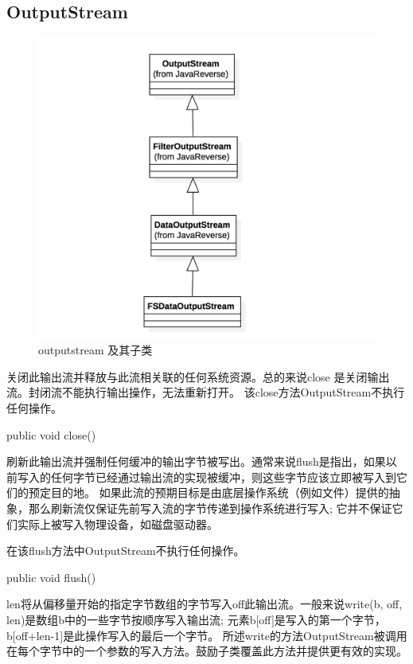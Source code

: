 \subsection{OutputStream}

\begin{figure}
\centering
\includegraphics[width =1\linewidth]{11.png}
\caption{outputstream 及其子类}
\label{fig:OutputStream}
\end{figure}



关闭此输出流并释放与此流相关联的任何系统资源。总的来说close 是关闭输出流。封闭流不能执行输出操作，无法重新打开。
该close方法OutputStream不执行任何操作。
\begin{java}
public void close()
\end{java}
刷新此输出流并强制任何缓冲的输出字节被写出。通常来说flush是指出，如果以前写入的任何字节已经通过输出流的实现被缓冲，则这些字节应该立即被写入到它们的预定目的地。
如果此流的预期目标是由底层操作系统（例如文件）提供的抽象，那么刷新流仅保证先前写入流的字节传递到操作系统进行写入; 它并不保证它们实际上被写入物理设备，如磁盘驱动器。

在该flush方法中OutputStream不执行任何操作。
\begin{java}
public void flush()
\end{java}
len将从偏移量开始的指定字节数组的字节写入off此输出流。一般来说write(b, off, len)是数组b中的一些字节按顺序写入输出流; 元素b[off]是写入的第一个字节，b[off+len-1]是此操作写入的最后一个字节。
所述write的方法OutputStream被调用在每个字节中的一个参数的写入方法。鼓励子类覆盖此方法并提供更有效的实现。

